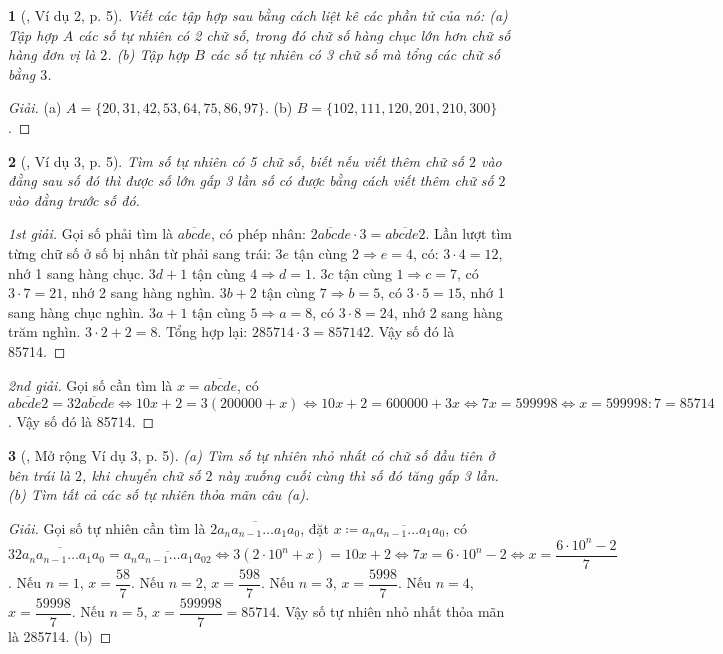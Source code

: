 \documentclass{article}
\newtheorem{baitoan}{}
\begin{document}
\begin{baitoan}[\cite{Binh_Toan_6_tap_1}, Ví dụ 2, p. 5]
	Viết các tập hợp sau bằng cách liệt kê các phần tử của nó: (a) Tập hợp $A$ các số tự nhiên có 2 chữ số, trong đó chữ số hàng chục lớn hơn chữ số hàng đơn vị là $2$. (b) Tập hợp $B$ các số tự nhiên có 3 chữ số mà tổng các chữ số bằng $3$.
\end{baitoan}

\begin{proof}[Giải]
	(a) $A = \{20,31,42,53,64,75,86,97\}$. (b) $B = \{102,111,120,201,210,300\}$.
\end{proof}

\begin{baitoan}[\cite{Binh_Toan_6_tap_1}, Ví dụ 3, p. 5]
	Tìm số tự nhiên có 5 chữ số, biết nếu viết thêm chữ số $2$ vào đằng sau số đó thì được số lớn gấp 3 lần số có được bằng cách viết thêm chữ số $2$ vào đằng trước số đó.
\end{baitoan}

\begin{proof}[1st giải]
	Gọi số phải tìm là $\overline{abcde}$, có phép nhân: $\overline{2abcde}\cdot3 = \overline{abcde2}$. Lần lượt tìm từng chữ số ở số bị nhân từ phải sang trái: $3e$ tận cùng $2\Rightarrow e = 4$, có: $3\cdot4 = 12$, nhớ 1 sang hàng chục. $3d + 1$ tận cùng $4\Rightarrow d = 1$. $3c$ tận cùng $1\Rightarrow c = 7$, có $3\cdot7 = 21$, nhớ 2 sang hàng nghìn. $3b + 2$ tận cùng $7\Rightarrow b = 5$, có $3\cdot5 = 15$, nhớ 1 sang hàng chục nghìn. $3a + 1$ tận cùng $5\Rightarrow a = 8$, có $3\cdot8 = 24$, nhớ 2 sang hàng trăm nghìn. $3\cdot2 + 2 = 8$. Tổng hợp lại: $285714\cdot3 = 857142$. Vậy số đó là 85714.
\end{proof}

\begin{proof}[2nd giải]
	Gọi số cần tìm là $x = \overline{abcde}$, có $\overline{abcde2} = 3\overline{2abcde}\Leftrightarrow10x + 2 = 3(200000 + x)\Leftrightarrow10x + 2 = 600000 + 3x\Leftrightarrow7x = 599998\Leftrightarrow x = 599998:7 = 85714$. Vậy số đó là 85714.
\end{proof}

\begin{baitoan}[\cite{Binh_Toan_6_tap_1}, Mở rộng Ví dụ 3, p. 5]
	(a) Tìm số tự nhiên nhỏ nhất có chữ số đầu tiên ở bên trái là $2$, khi chuyển chữ số $2$ này xuống cuối cùng thì số đó tăng gấp 3 lần. (b) Tìm tất cả các số tự nhiên thỏa mãn câu (a).
\end{baitoan}

\begin{proof}[Giải]
	Gọi số tự nhiên cần tìm là $\overline{2a_na_{n-1}\ldots a_1a_0}$, đặt $x\coloneqq\overline{a_na_{n-1}\ldots a_1a_0}$, có $3\overline{2a_na_{n-1}\ldots a_1a_0} = \overline{a_na_{n-1}\ldots a_1a_02}\Leftrightarrow3(2\cdot10^n + x) = 10x + 2\Leftrightarrow7x = 6\cdot10^n - 2\Leftrightarrow x = \dfrac{6\cdot10^n - 2}{7}$. Nếu $n = 1$, $x = \dfrac{58}{7}$. Nếu $n = 2$, $x = \dfrac{598}{7}$. Nếu $n = 3$, $x = \dfrac{5998}{7}$. Nếu $n = 4$, $x = \dfrac{59998}{7}$. Nếu $n = 5$, $x = \dfrac{599998}{7} = 85714$. Vậy số tự nhiên nhỏ nhất thỏa mãn là 285714. (b) 
\end{proof}
\end{document}
